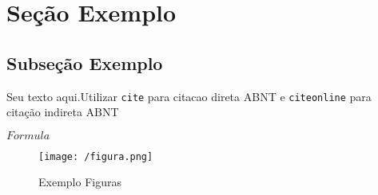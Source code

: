 \documentclass[
	12pt,				%
	a4paper,			%
	english,			%
	brazil				%
	]{article}
\begin{document}
\section{Seção  Exemplo}

\subsection{Subseção Exemplo}
\label{sec:exemp1}

\par Seu texto aqui.Utilizar \texttt{cite} para citacao direta ABNT e \texttt{citeonline} para citação indireta ABNT

\par $Formula$ 

\begin{figure*}[htp]
    \centering
    \caption{Exemplo Figuras}
    \texttt{[image: /figura.png]}
    \label{fig:kg}
\end{figure*}



\renewcommand{\refname}{Referencial Bibliográfico}

    
\end{document}

